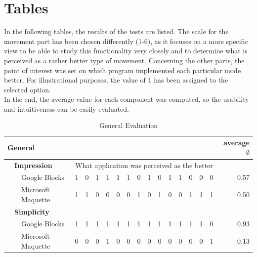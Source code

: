 \documentclass{report}
\begin{document}
	\section{Tables}
	\startsection	
		In the following tables, the results of the tests are listed. The scale for the movement part has been chosen differently (1-6), as it focuses on a more specific view to be able to study this functionality very closely and to determine what is perceived as a rather better type of movement. Concerning the other parts, the point of interest was set on which program implemented each particular mode better. For illustrational purposes, the value of 1 has been assigned to the selected option. \\
		In the end, the average value for each component was computed, so the usability and intuitiveness can be easily evaluated. \\		
		\begin{table}[H]
			\begin{center}
			\begin{tabular}{@{}|lll|llllllllllllll|r|@{}}
				\hline
				\multicolumn{3}{|l|}{\textbf{\underline{General}}} & & & & & & & & & & & & & & & \textbf{average $\emptyset$} \\ \hline
				& \multicolumn{2}{l|}{\textbf{Impression}} & \multicolumn{14}{c|}{\small{What application was perceived as the better}} &\\ \hline
				& & Google Blocks & 1 & 0 & 1 & 1 & 1 & 1 & 0 & 1 & 0 & 1 & 1 & 0 & 0 & 0 & 0.57 \\
				& & Microsoft Maquette & 1 & 1 & 0 & 0 & 0 & 0 & 1 & 0 & 1 & 0 & 0 & 1 & 1 & 1 & 0.50 \\ \hline
				
				& \multicolumn{2}{l|}{\textbf{Simplicity}} & & & & & & & & & & & & & & &\\ \hline
				& & Google Blocks & 1 & 1 & 1 & 1 & 1 & 1 & 1 & 1 & 1 & 1 & 1 & 1 & 1 & 0 & 0.93 \\
				& & Microsoft Maquette & 0 & 0 & 0 & 1 & 0 & 0 & 0 & 0 & 0 & 0 & 0 & 0 & 0 & 1 & 0.13 \\ \hline
			\end{tabular}
			\caption{General Evaluation}
			\label{tab:GeneralEvaluation}
			\end{center}
		\end{table}
		
\end{document}
